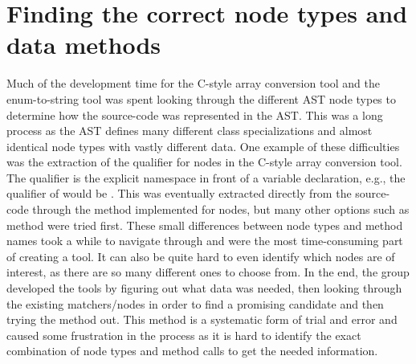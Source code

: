 
\section{Finding the correct node types and data methods}

Much of the development time for the C-style array conversion tool and the enum-to-string tool was spent looking through the different AST node types to determine how the source-code was represented in the AST.
This was a long process as the AST defines many different class specializations and almost identical node types with vastly different data.
One example of these difficulties was the extraction of the qualifier for  nodes in the C-style array conversion tool.
The qualifier is the explicit namespace in front of a variable declaration, e.g., the qualifier of  would be .
This was eventually extracted directly from the source-code through the   method implemented for  nodes, but many other options such as  method were tried first.
These small differences between node types and method names took a while to navigate through and were the most time-consuming part of creating a tool.
It can also be quite hard to even identify which nodes are of interest, as there are so many different ones to choose from.
In the end, the group developed the tools by figuring out what data was needed, then looking through the existing matchers/nodes in order to find a promising candidate and then trying the method out.
This method is a systematic form of trial and error and caused some frustration in the process as it is hard to identify the exact combination of node types and method calls to get the needed information.